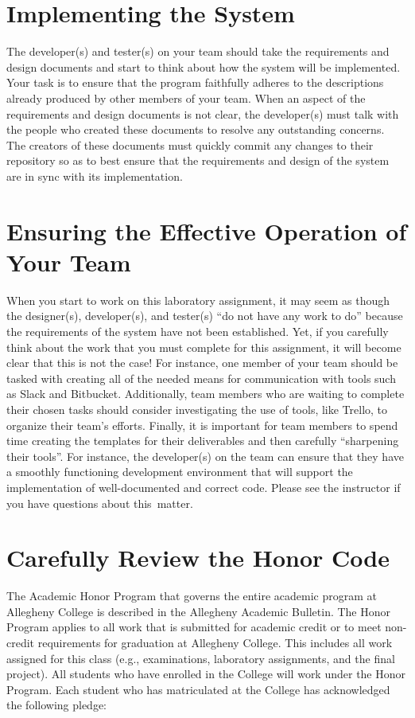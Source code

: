 \section*{Implementing the System}

The developer(s) and tester(s) on your team should take the requirements and design documents and start to think about
how the system will be implemented. Your task is to ensure that the program faithfully adheres to the descriptions
already produced by other members of your team. When an aspect of the requirements and design documents is not clear,
the developer(s) must talk with the people who created these documents to resolve any outstanding concerns. The creators
of these documents must quickly commit any changes to their repository so as to best ensure that the requirements and design
of the system are in sync with its implementation.

\section*{Ensuring the Effective Operation of Your Team}

When you start to work on this laboratory assignment, it may seem as though the designer(s), developer(s), and tester(s)
``do not have any work to do'' because the requirements of the system have not been established. Yet, if you carefully
think about the work that you must complete for this assignment, it will become clear that this is not the case! For
instance, one member of your team should be tasked with creating all of the needed means for communication with tools
such as Slack and Bitbucket. Additionally, team members who are waiting to complete their chosen tasks should consider
investigating the use of tools, like Trello, to organize their team's efforts. Finally, it is important for team
members to spend time creating the templates for their deliverables and then carefully ``sharpening their tools''. For
instance, the developer(s) on the team can ensure that they have a smoothly functioning development environment that
will support the implementation of well-documented and correct code. Please see the instructor if you have questions
about \mbox{this matter}.

\section*{Carefully Review the Honor Code}

The Academic Honor Program that governs the entire academic program at Allegheny College is described in the Allegheny
Academic Bulletin.  The Honor Program applies to all work that is submitted for academic credit or to meet non-credit
requirements for graduation at Allegheny College.  This includes all work assigned for this class (e.g., examinations,
  laboratory assignments, and the final project).  All students who have enrolled in the College will work under the Honor
Program.  Each student who has matriculated at the College has acknowledged the following pledge:


